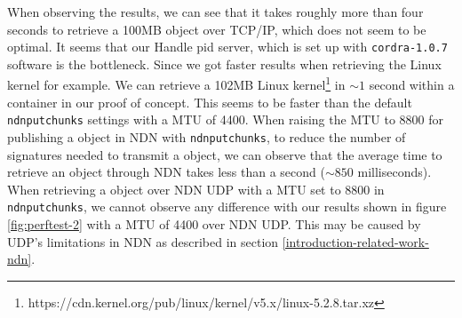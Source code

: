 When observing the results, we can see that it takes roughly more than four seconds to retrieve a 100MB object over TCP/IP, which does not seem to be optimal. 
It seems that our Handle \gls{pid} server, which is set up with \texttt{cordra-1.0.7} software is the bottleneck. Since we got faster results when retrieving the Linux kernel for example. We can retrieve a 102MB Linux kernel\footnote{https://cdn.kernel.org/pub/linux/kernel/v5.x/linux-5.2.8.tar.xz} in ${\sim}1$ second within a container in our proof of concept. This seems to be faster than the default \texttt{ndnputchunks} settings with a MTU of 4400. When raising the MTU to 8800 for publishing a object in NDN with \texttt{ndnputchunks}, to reduce the number of signatures needed to transmit a object, we can observe that the average time to retrieve an object through NDN takes less than a second (${\sim}850$ milliseconds). 
When retrieving a object over NDN UDP with a MTU set to 8800 in \texttt{ndnputchunks}, we cannot observe any difference with our results shown in figure \ref{fig:perftest-2} with a MTU of 4400 over NDN UDP. This may be caused by UDP's limitations in NDN as described in section \ref{introduction-related-work-ndn}. 



